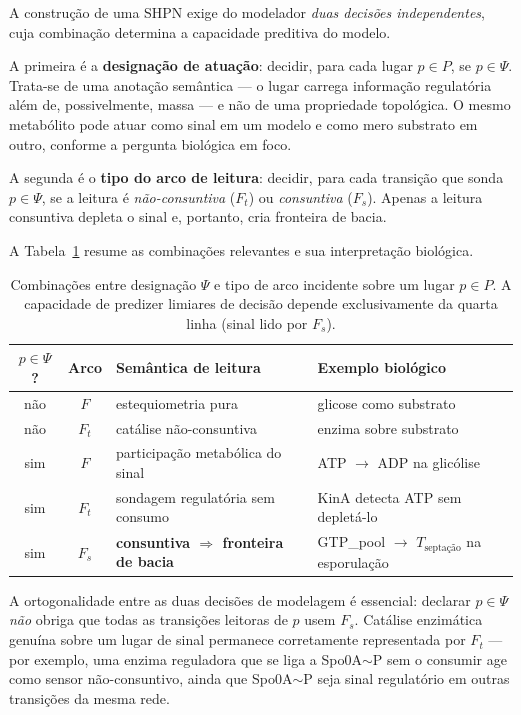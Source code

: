 A construção de uma SHPN exige do modelador \emph{duas decisões
independentes}, cuja combinação determina a capacidade preditiva do modelo.

A primeira é a \textbf{designação de atuação}: decidir, para cada lugar
$p \in P$, se $p \in \Psi$. Trata-se de uma anotação semântica --- o lugar
carrega informação regulatória além de, possivelmente, massa --- e não de uma
propriedade topológica. O mesmo metabólito pode atuar como sinal em um modelo
e como mero substrato em outro, conforme a pergunta biológica em foco.

A segunda é o \textbf{tipo do arco de leitura}: decidir, para cada transição
que sonda $p \in \Psi$, se a leitura é \emph{não-consuntiva} ($F_t$) ou
\emph{consuntiva} ($F_s$). Apenas a leitura consuntiva depleta o sinal e,
portanto, cria fronteira de bacia.

A Tabela~\ref{tab:decisoes-modelador} resume as combinações relevantes
e sua interpretação biológica.

\begin{table}[htbp]
\centering
\caption{Combinações entre designação $\Psi$ e tipo de arco incidente
sobre um lugar $p \in P$. A capacidade de predizer limiares de decisão
depende exclusivamente da quarta linha (sinal lido por $F_s$).}
\label{tab:decisoes-modelador}
\renewcommand{\arraystretch}{1.25}
\small
\begin{tabularx}{\textwidth}{@{}c c l X@{}}
\toprule
\textbf{$p \in \Psi$?} & \textbf{Arco} & \textbf{Semântica de leitura} & \textbf{Exemplo biológico} \\
\midrule
não & $F$   & estequiometria pura              & glicose como substrato \\
não & $F_t$ & catálise não-consuntiva          & enzima sobre substrato \\
sim & $F$   & participação metabólica do sinal & ATP $\to$ ADP na glicólise \\
sim & $F_t$ & sondagem regulatória sem consumo & KinA detecta ATP sem depletá-lo \\
sim & $F_s$ & \textbf{consuntiva $\Rightarrow$ fronteira de bacia} & GTP\_pool $\to$ $T_{\text{septação}}$ na esporulação \\
\bottomrule
\end{tabularx}
\end{table}

A ortogonalidade entre as duas decisões de modelagem é essencial:
declarar $p \in \Psi$ \emph{não} obriga que todas as transições
leitoras de $p$ usem $F_s$. Catálise enzimática genuína sobre um lugar de sinal
permanece corretamente representada por $F_t$ --- por exemplo, uma
enzima reguladora que se liga a Spo0A${\sim}$P sem o consumir age como
sensor não-consuntivo, ainda que Spo0A${\sim}$P seja sinal regulatório
em outras transições da mesma rede.

